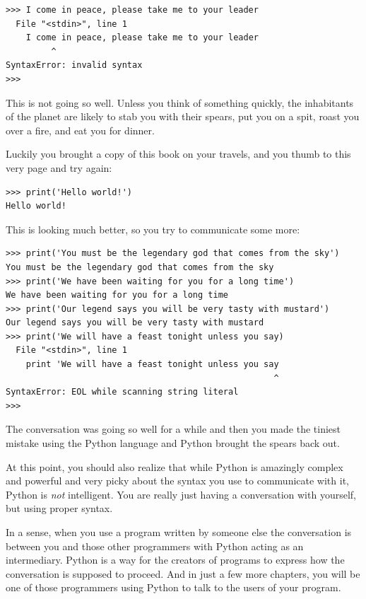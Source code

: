 \beforeverb
\begin{verbatim}
>>> I come in peace, please take me to your leader
  File "<stdin>", line 1
    I come in peace, please take me to your leader
         ^
SyntaxError: invalid syntax
>>> 
\end{verbatim}
\afterverb
%
This is not going so well.  Unless you think of something quickly,
the inhabitants of the planet are likely to stab you with their spears, 
put you on a spit, roast you over a fire, and eat you for dinner.

Luckily you brought a copy of this book on your travels, and you thumb to
this very page and try again:

\beforeverb
\begin{verbatim}
>>> print('Hello world!')
Hello world!
\end{verbatim}
\afterverb
%
This is looking much better, so you try to communicate some
more:

\beforeverb
\begin{verbatim}
>>> print('You must be the legendary god that comes from the sky')
You must be the legendary god that comes from the sky
>>> print('We have been waiting for you for a long time')
We have been waiting for you for a long time
>>> print('Our legend says you will be very tasty with mustard')
Our legend says you will be very tasty with mustard
>>> print('We will have a feast tonight unless you say)
  File "<stdin>", line 1
    print 'We will have a feast tonight unless you say
                                                     ^
SyntaxError: EOL while scanning string literal
>>> 
\end{verbatim}
\afterverb
%
The conversation was going so well for a while and then you
made the tiniest mistake using the Python language and Python 
brought the spears back out.

At this point, you should also realize that while Python 
is amazingly complex and powerful and very picky about 
the syntax you use to communicate with it, Python is {\em 
not} intelligent.  You are really just having a conversation
with yourself, but using proper syntax.

In a sense, when you use a program written by someone else
the conversation is between you and those other
programmers with Python acting as an intermediary.  Python
is a way for the creators of programs to express how the 
conversation is supposed to proceed.  And
in just a few more chapters, you will be one of those
programmers using Python to talk to the users of your program.

